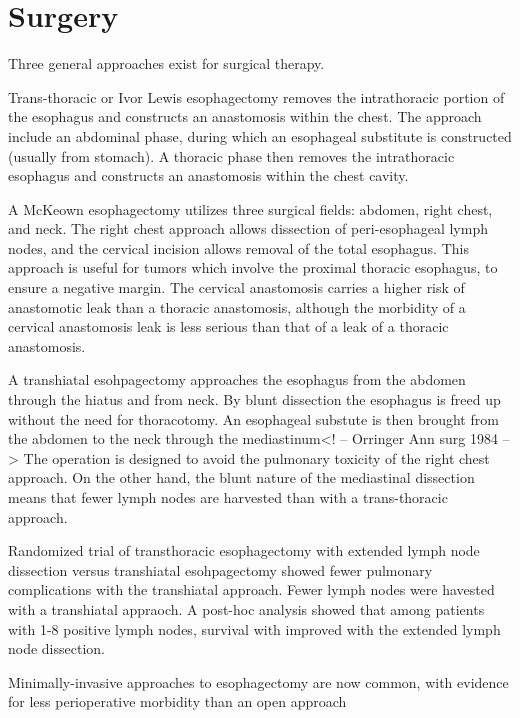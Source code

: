 \documentclass[
]{book}
\begin{document}
\citep{markar922}

\hypertarget{surgery-1}{%
\chapter{Surgery}\label{surgery-1}}

Three general approaches exist for surgical therapy.

Trans-thoracic or Ivor Lewis esophagectomy\citep{visbal1803} removes the intrathoracic portion of the esophagus and constructs an anastomosis within the chest. The approach include an abdominal phase, during which an esophageal substitute is constructed (usually from stomach). A thoracic phase then removes the intrathoracic esophagus and constructs an anastomosis within the chest cavity.

A McKeown esophagectomy utilizes three surgical fields: abdomen, right chest, and neck. The right chest approach allows dissection of peri-esophageal lymph nodes, and the cervical incision allows removal of the total esophagus.\citep{mckeown259} This approach is useful for tumors which involve the proximal thoracic esophagus, to ensure a negative margin. The cervical anastomosis carries a higher risk of anastomotic leak than a thoracic anastomosis, although the morbidity of a cervical anastomosis leak is less serious than that of a leak of a thoracic anastomosis.

A transhiatal esohpagectomy approaches the esophagus from the abdomen through the hiatus and from neck. By blunt dissection the esophagus is freed up without the need for thoracotomy. An esophageal substute is then brought from the abdomen to the neck through the mediastinum\citep{orringer643}\citep{orringer282}\textless! -- Orringer Ann surg 1984 --\textgreater{} The operation is designed to avoid the pulmonary toxicity of the right chest approach. On the other hand, the blunt nature of the mediastinal dissection means that fewer lymph nodes are harvested than with a trans-thoracic approach.

Randomized trial of transthoracic esophagectomy with extended lymph node dissection versus transhiatal esohpagectomy showed fewer pulmonary complications with the transhiatal approach. \citep{hulscher1662} Fewer lymph nodes were havested with a transhiatal appraoch. A post-hoc analysis showed that among patients with 1-8 positive lymph nodes, survival with improved with the extended lymph node dissection.\citep{omloo1715}

Minimally-invasive approaches to esophagectomy are now common, with evidence for less perioperative morbidity than an open approach \citep{biere1887}\citep{zhoue0132889}
\end{document}
